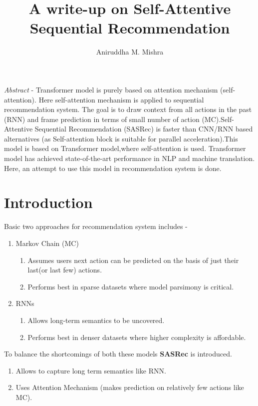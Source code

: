 \documentclass[11pt]{article}
\title{A write-up on Self-Attentive Sequential Recommendation}
\author{Aniruddha M. Mishra}
\affil{411650, National Institute of Technology, Andhra Pradesh}
\date{\vspace{-5ex}}
\begin{document}
\maketitle

\emph{Abstract} - 
	Transformer model is purely based on attention mechanism (self-attention)\cite{jAlammar2}. Here self-attention mechanism is applied  to sequential recommendation system. The goal is to draw context from all actions in the past (RNN) and frame prediction in terms of small number of action (MC).Self-Attentive Sequential Recommendation (SASRec) \cite{kang2018self} is faster than CNN/RNN based alternatives (as Self-attention block is suitable for parallel acceleration).This model is based on Transformer model,where self-attention is used. Transformer model has achieved state-of-the-art performance in NLP and machine translation. Here, an attempt to use this model in recommendation system is done.

\section{Introduction}
Basic two approaches for recommendation system includes -
\begin{enumerate}
			\item Markov Chain (MC)
				\begin{enumerate}
					\item Assumes users next action can be predicted on the basis of just their last(or last few) actions.
					\item Performs best in sparse datasets where model parsimony is critical.
				\end{enumerate}
			\item RNNs
				\begin{enumerate}
					\item Allows long-term semantics to be uncovered.
					\item Performs best in denser datasets where higher complexity is affordable.
				\end{enumerate}
\end{enumerate}
To balance the shortcomings of both these models \textbf{SASRec} is introduced.
\begin{enumerate}
	\item Allows to capture long term semantics like RNN.
	\item Uses Attention Mechanism (makes prediction on relatively few actions like MC).
\end{enumerate}
\end{document}
